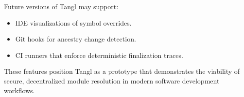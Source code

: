 \documentclass[sigplan,screen]{acmart}
\begin{document}
Future versions of Tangl may support:

\begin{itemize}
  \item IDE visualizations of symbol overrides.
  \item Git hooks for ancestry change detection.
  \item CI runners that enforce deterministic finalization traces.
\end{itemize}

These features position Tangl as a prototype that demonstrates the viability of secure, decentralized module resolution in modern software development workflows.



\end{document}
